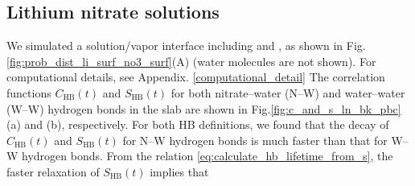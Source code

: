 \subsection{Lithium nitrate solutions} \label{PARAGRAPH_LINO3}
%
%
We simulated a \LiN solution/vapor interface including \Li and \nitrate, as shown in Fig.\thinspace\ref{fig:prob_dist_li_surf_no3_surf}(A) (water molecules are not shown). 
For computational details, see Appendix. \ref{computational_detail}
The correlation functions $C_\text{HB}(t)$ and $S_\text{HB}(t)$ for both nitrate--water (N--W) and water--water (W--W) hydrogen bonds 
in the slab are shown in Fig.\thinspace\ref{fig:c_and_s_ln_bk_pbc} (a) and (b), respectively.
For both HB definitions, we found that the decay of $C_\text{HB}(t)$ and $S_\text{HB}(t)$ for N--W hydrogen bonds is much faster 
than that for W--W hydrogen bonds. From the relation \ref{eq:calculate_hb_lifetime_from_s}, the faster relaxation of $S_\text{HB}(t)$ implies that 
